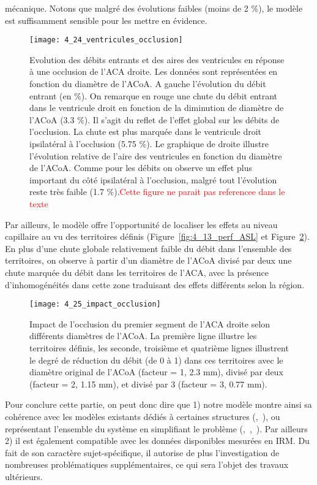 mécanique. Notons que malgré des évolutions faibles (moins de 2 \%), le modèle est suffisamment
sensible pour les mettre en évidence.\\
\begin{figure}[!t]
\centering
\texttt{[image: 4\_24\_ventricules\_occlusion]}
\caption{ Evolution des débits entrants et des aires des ventricules en réponse à une occlusion de l'ACA droite. Les données
sont représentées en fonction du diamètre de l'ACoA. A gauche l’évolution du débit entrant (en \%). On remarque en rouge
une chute du débit entrant dans le ventricule droit en fonction de la diminution de diamètre de l’ACoA (3.3 \%). Il s’agit du
reflet de l’effet global sur les débits de l’occlusion. La chute est plus marquée dans le ventricule droit ipsilatéral à l’occlusion
(5.75 \%). Le graphique de droite illustre l’évolution relative de l’aire des ventricules en fonction du diamètre de l’ACoA.
Comme pour les débits on observe un effet plus important du côté ipsilatéral à l’occlusion, malgré tout l’évolution reste très
faible (1.7 \%).\textcolor{red} {Cette figure ne parait pas referencee dans le texte}}
\label{fig:4_24_occlusion_ventricule}	
\end{figure}
Par ailleurs, le modèle offre l’opportunité de localiser les effets au niveau capillaire au vu des
territoires définis (Figure~\ref{fig:4_13_perf_ASL} et Figure~\ref{fig:4_25_impact_occlusion}). En plus d’une chute globale relativement faible du débit
dans l’ensemble des territoires, on observe à partir d’un diamètre de l’ACoA divisé par deux une chute
marquée du débit dans les territoires de l’ACA, avec la présence d’inhomogénéités dans cette zone
traduisant des effets différents selon la région.\\
\begin{figure}[!t]
\centering
\texttt{[image: 4\_25\_impact\_occlusion]}
\caption{ Impact de l'occlusion du premier segment de l'ACA droite selon différents diamètres de l'ACoA. La première ligne
illustre les territoires définis, les seconde, troisième et quatrième lignes illustrent le degré de réduction du débit (de 0 à 1)
dans ces territoires avec le diamètre original de l’ACoA (facteur = 1, 2.3 mm), divisé par deux (facteur = 2, 1.15 mm), et divisé
par 3 (facteur = 3, 0.77 mm).}
\label{fig:4_25_impact_occlusion}	
\end{figure}
Pour conclure cette partie, on peut donc dire que 1) notre modèle montre ainsi sa cohérence
avec les modèles existants dédiés à certaines structures (\cite{Cebral2003},~\cite{Cassot1995}), ou représentant l’ensemble du
système en simplifiant le problème (\cite{Zagzoule1986},~\cite{Linninger2009},~\cite{Kim2007}). Par ailleurs 2) il est également compatible avec les
données disponibles mesurées en IRM. Du fait de son caractère sujet-spécifique, il autorise de plus
l’investigation de nombreuses problématiques supplémentaires, ce qui sera l’objet des travaux
ultérieurs.


{}
